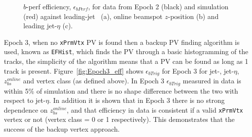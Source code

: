 \begin{figure}[!ht]
\begin{center}
\end{center}
\caption{$b$-perf efficiency, $\epsilon_{bPerf}$, for data from Epoch 2 (black) and simulation (red) against leading-jet \pT~(a), online beamspot $z$-position (b) and leading jet-$\eta$ (c).}
\label{fig:Epoch2_bperf}
\end{figure}
Epoch 3, when no \verb|xPrmVtx| PV is found then a backup PV finding algorithm is used, known as \verb|EFHist|, which finds the PV through a basic histogramming of the tracks,
the simplicity of the algorithm means that a PV can be found as long as 1 track is present.
Figure~\ref{fig:Epoch3_eff} shows $\epsilon_{bTrig}$ for Epoch 3 for jet-\pT, jet-$\eta$,  $z_{bs}^{online}$ and vertex class (as defined above).
In Epoch 3 $\epsilon_{bTrig}$ measured in data is within 5\% of simulation and there is no shape difference between the two with respect to jet-$\eta$.
In addition it is shown that in Epoch 3 there is no strong dependence on  $z_{bs}^{online}$,
and that efficiency in data is consistent if a valid \verb|xPrmVtx| vertex or not (vertex class = 0 or 1 respectively).
This demonstrates that the success of the backup vertex approach.

